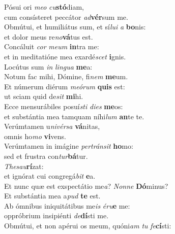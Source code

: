 \evenverse Pósui ori \textit{me}\textit{o} \textit{cu}\textbf{stó}diam,~\*\\
\evenverse cum consísteret peccátor \textit{ad}\textbf{vér}sum me.\\
\oddverse Obmútui, et humiliátus sum, et sí\textit{lu}\textit{i} \textit{a} \textbf{bo}nis:~\*\\
\oddverse et dolor meus re\textit{no}\textbf{vá}tus est.\\
\evenverse Concáluit \textit{cor} \textit{me}\textit{um} \textbf{in}tra me:~\*\\
\evenverse et in meditatióne mea exardé\textit{scet} \textbf{i}gnis.\\
\oddverse Locútus sum \textit{in} \textit{lin}\textit{gua} \textbf{me}a:~\*\\
\oddverse Notum fac mihi, Dómine, fi\textit{nem} \textbf{me}um.\\
\evenverse Et númerum diérum \textit{me}\textit{ó}\textit{rum} \textbf{quis} est:~\*\\
\evenverse ut sciam quid de\textit{sit} \textbf{mi}hi.\\
\oddverse Ecce mensurábiles posuí\textit{sti} \textit{di}\textit{es} \textbf{me}os:~\*\\
\oddverse et substántia mea tamquam níhi\textit{lum} \textbf{an}te te.\\
\evenverse Verúmtamen u\textit{ni}\textit{vér}\textit{sa} \textbf{vá}nitas,~\*\\
\evenverse omnis ho\textit{mo} \textbf{vi}vens.\\
\oddverse Verúmtamen in imágine \textit{per}\textit{trán}\textit{sit} \textbf{ho}mo:~\*\\
\oddverse sed et frustra con\textit{tur}\textbf{bá}tur.\\
\evenverse \textit{The}\textit{sau}\textbf{rí}zat:~\*\\
\evenverse et ignórat cui congregá\textit{bit} \textbf{e}a.\\
\oddverse Et nunc quæ est exspectátio me\textit{a}? \textit{Non}\textit{ne} \textbf{Dó}minus?~\*\\
\oddverse Et substántia mea a\textit{pud} \textbf{te} est.\\
\evenverse Ab ómnibus iniquitátibus me\textit{is} \textit{é}\textit{ru}\textbf{e} me:~\*\\
\evenverse oppróbrium insipiénti \textit{de}\textbf{dí}sti me.\\
\oddverse Obmútui, et non apérui os meum, quóni\textit{am} \textit{tu} \textit{fe}\textbf{cí}sti:~\*\\
